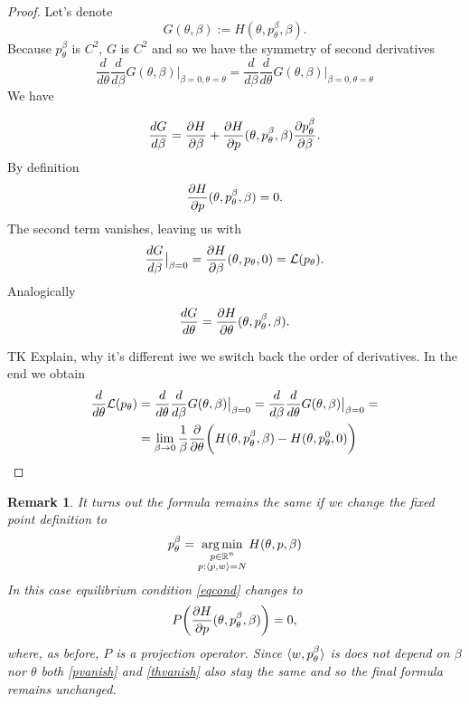 \documentclass[a4paper,10pt]{report}
\newtheorem{remark}{Remark}
\begin{document}
\begin{proof} Let's denote
 \begin{equation}
 G(\theta, \beta) := H(\theta, p_\theta^\beta, \beta).
\end{equation}
Because $p_\theta^\beta$ is $C^2$, $G$ is $C^2$ and so we have the symmetry of second derivatives
\begin{equation}
 \frac{d}{d\theta}\frac{d}{d\beta}G(\theta,\beta)\big|_{\beta=0, \theta = \theta} =\frac{d}{d\beta}\frac{d}{d\theta}G(\theta,\beta)\big|_{\beta=0, \theta = \theta}
\end{equation}
We have

\begin{equation}\label{eqcond}
 \frac{dG}{d\beta} = \frac{\partial H}{\partial \beta} + \frac{\partial H}{\partial p}(\theta,p_\theta^{\beta}, \beta)\frac{\partial p_\theta^{\beta}}{\partial \beta}.
\end{equation}
By definition
\begin{equation}
\frac{\partial H}{\partial p}(\theta,p_\theta^{\beta}, \beta)=0.
\end{equation}
The second term vanishes, leaving us with
\begin{equation}\label{pvanish}
  \frac{dG}{d\beta}\big|_{\beta=0} = \frac{\partial H}{\partial \beta}(\theta, p_\theta, 0)=\mathcal{L}(p_\theta).
\end{equation}
Analogically
\begin{equation}\label{thvanish}
 \frac{dG}{d\theta}=\frac{\partial H}{\partial \theta}(\theta, p_\theta^{\beta}, \beta).
\end{equation}

TK Explain, why it's different iwe we switch back the order of derivatives.
In the end we obtain
\begin{align}
 \frac{d}{d\theta} \mathcal{L}(p_\theta) &=\frac{d}{d\theta}\frac{d}{d\beta}G(\theta,\beta)\big|_{\beta=0} = \frac{d}{d\beta}\frac{d}{d\theta}G(\theta,\beta)\big|_{\beta=0}=\\
 &=\lim_{\beta \to 0}\frac{1}{\beta} \frac{\partial }{\partial \theta} \bigg(H(\theta, p_\theta^\beta,\beta) - H(\theta, p_\theta^0, 0)\bigg)
\end{align}

\end{proof}

\begin{remark}
 It turns out the formula remains the same if we change the fixed point definition to
\begin{equation}
 p_\theta^\beta = \operatorname*{arg\,min}_{\substack{p \in \mathbb{R}^n \\ p: \langle p, w \rangle=N }} H(\theta, p, \beta)
\end{equation}
In this case equilibrium condition \ref{eqcond} changes to
\begin{equation*}
P\bigg(\frac{\partial H}{\partial p}(\theta,p_\theta^{\beta}, \beta)\bigg)=0,
\end{equation*}
where, as before, $P$ is a projection operator. Since $\langle w, p_\theta^{\beta} \rangle$ is does not depend on $\beta$ nor $\theta$ both \ref{pvanish} and \ref{thvanish} also stay the same and so the final formula remains unchanged.

\end{remark}
\end{document}
